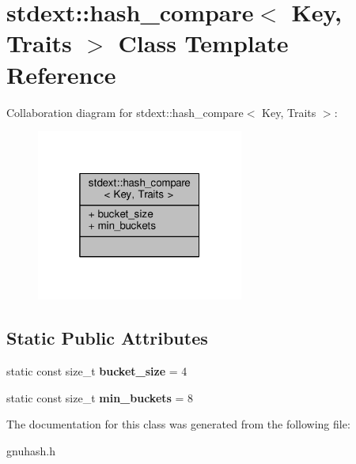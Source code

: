 \hypertarget{classstdext_1_1hash__compare}{}\section{stdext\+:\+:hash\+\_\+compare$<$ Key, Traits $>$ Class Template Reference}
\label{classstdext_1_1hash__compare}


Collaboration diagram for stdext\+:\+:hash\+\_\+compare$<$ Key, Traits $>$\+:
\nopagebreak
\begin{figure}[H]
\begin{center}
\leavevmode
\includegraphics[width=193pt]{d8/d61/classstdext_1_1hash__compare__coll__graph}
\end{center}
\end{figure}
\subsection*{Static Public Attributes}
\begin{DoxyCompactItemize}
\item 
static const size\+\_\+t {\bfseries bucket\+\_\+size} = 4\hypertarget{classstdext_1_1hash__compare_a505312df6032e605fe1f0d20f57a773e}{}\label{classstdext_1_1hash__compare_a505312df6032e605fe1f0d20f57a773e}

\item 
static const size\+\_\+t {\bfseries min\+\_\+buckets} = 8\hypertarget{classstdext_1_1hash__compare_a2f257de9473a47d56c23a85d17fcf9da}{}\label{classstdext_1_1hash__compare_a2f257de9473a47d56c23a85d17fcf9da}

\end{DoxyCompactItemize}


The documentation for this class was generated from the following file\+:\begin{DoxyCompactItemize}
\item 
gnuhash.\+h\end{DoxyCompactItemize}
